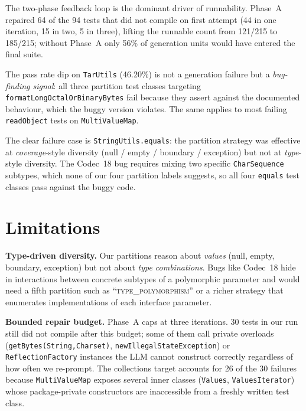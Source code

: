 \documentclass[conference]{IEEEtran}
\begin{document}
The two-phase feedback loop is the dominant driver of runnability.
Phase~A repaired 64 of the 94 tests that did not compile on first
attempt (44 in one iteration, 15 in two, 5 in three), lifting the
runnable count from 121/215 to 185/215; without Phase~A only 56\% of
generation units would have entered the final suite.

The pass rate dip on \texttt{TarUtils} (46.20\%) is not a
generation failure but a \emph{bug-finding signal}: all three
partition test classes targeting
\texttt{format\-Long\-Octal\-Or\-Binary\-Bytes} fail because they
assert against the documented behaviour, which the buggy version
violates. The same applies to most failing \texttt{readObject} tests
on \texttt{MultiValueMap}.

The clear failure case is \texttt{StringUtils.equals}: the partition
strategy was effective at \emph{coverage}-style diversity (null /
empty / boundary / exception) but not at \emph{type}-style diversity.
The Codec~18 bug requires mixing two specific \texttt{Char\-Sequence}
subtypes, which none of our four partition labels suggests, so all
four \texttt{equals} test classes pass against the buggy code.

\section{Limitations}
\label{sec:limitations}

\textbf{Type-driven diversity.} Our partitions reason about
\emph{values} (null, empty, boundary, exception) but not about
\emph{type combinations}. Bugs like Codec~18 hide in interactions
between concrete subtypes of a polymorphic parameter and would need a
fifth partition such as ``\textsc{type\_polymorphism}'' or a richer
strategy that enumerates implementations of each interface parameter.

\textbf{Bounded repair budget.} Phase~A caps at three iterations. 30
tests in our run still did not compile after this budget; some of
them call private overloads (\texttt{getBytes(String,Charset)},
\texttt{newIllegalStateException}) or \texttt{ReflectionFactory}
instances the LLM cannot construct correctly regardless of how often
we re-prompt. The collections target accounts for 26 of the 30
failures because \texttt{MultiValueMap} exposes several inner
classes (\texttt{Values}, \texttt{ValuesIterator}) whose
package-private constructors are inaccessible from a freshly written
test class.
\end{document}
